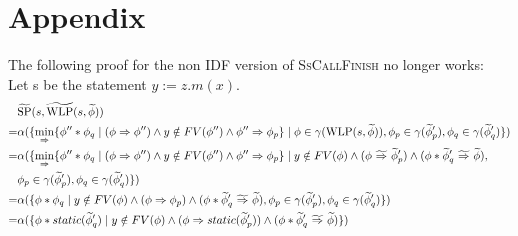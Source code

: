 \documentclass {article}
\newcommand{\tphi}{\widetilde{\phi}}
\newcommand{\imp}{\Rightarrow}
\newcommand{\timp}{\ \widetilde{\Rightarrow}\ }
\newcommand{\wlp}[2]{\textup{WLP}(#1,#2)}
\newcommand{\twlp}[2]{\widetilde{\textup{WLP}}(#1,#2)}
\newcommand{\tsp}[2]{\widetilde{\textup{SP}}(#1,#2)}
\begin{document}
\pagebreak
\section*{Appendix}
The following proof for the non IDF version of \textsc{SsCallFinish} no longer works:\\ 
Let s be the statement $y := z.m(x)$.\\
\begin{align*}
&\tsp{s}{\twlp{s}{\tphi}} \\
=&\alpha(\{\min_{\Rightarrow}\{ \phi'' \ast \phi_q \mid (\phi \Rightarrow \phi'') \wedge y \notin  FV(\phi'') \wedge \phi'' \Rightarrow \phi_p\} \mid \phi\in \gamma(\wlp{s}{\tphi}), \phi_p \in \gamma(\tphi_p'), \phi_q \in \gamma(\tphi_q')\})\\
=&\alpha(\{\min_{\Rightarrow}\{ \phi'' \ast \phi_q \mid (\phi \Rightarrow \phi'') \wedge y \notin  FV(\phi'') \wedge \phi'' \Rightarrow \phi_p\} \mid y \notin FV(\phi) \wedge (\phi \timp \tphi'_p) \wedge (\phi \ast \tphi'_q \timp \tphi) , \\&\phi_p \in \gamma(\tphi_p'), \phi_q \in \gamma(\tphi_q')\})\\
=&\alpha(\{ \phi \ast \phi_q \mid y \notin FV(\phi) \wedge (\phi \imp \phi_p) \wedge (\phi \ast \tphi'_q \timp \tphi), \phi_p \in \gamma(\tphi_p'), \phi_q \in \gamma(\tphi_q') \})\\
=&\alpha(\{ \phi \ast static(\tphi'_q) \mid y \notin FV(\phi) \wedge (\phi \imp static(\tphi'_p)) \wedge (\phi \ast \tphi'_q \timp \tphi) \})
\end{align*}
\end{document}
